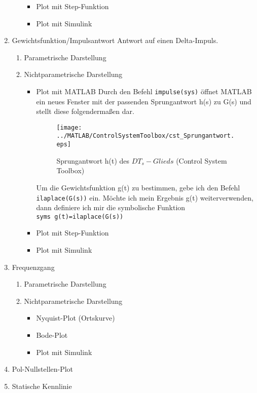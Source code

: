 \begin{enumerate}
\begin{enumerate}
\begin{itemize}
                    \item{Plot mit Step-Funktion}
                    \item{Plot mit Simulink}
                \end{itemize}
        \end{enumerate}

    \item{Gewichtsfunktion/Impulsantwort}
        Antwort auf einen Delta-Impuls.
        \begin{enumerate}
            \item{Parametrische Darstellung}
            \item{Nichtparametrische Darstellung}
                \begin{itemize}
                    \item{Plot mit MATLAB}
                    Durch den Befehl \texttt{impulse(sys)} öffnet MATLAB ein neues Fenster mit der passenden Sprungantwort h(s) zu G(s) und stellt diese folgendermaßen dar.
                    \begin{figure}[H]
                        \centering
                        \texttt{[image: ../MATLAB/ControlSystemToolbox/cst\_Sprungantwort.eps]}
                        \caption{Sprungantwort h(t) des $DT_s-Glieds$ (Control System Toolbox)}
                    \end{figure}

                    
                    Um die Gewichtsfunktion g(t) zu bestimmen, gebe ich den Befehl\\
                        \texttt{ilaplace(G(s))}
                    ein.
                    Möchte ich mein Ergebnis g(t) weiterverwenden, dann definiere ich mir die symbolische Funktion\\
                        \texttt{syms g(t)=ilaplace(G(s))}

                    \item{Plot mit Step-Funktion}
                    \item{Plot mit Simulink}
                \end{itemize}
        \end{enumerate}

    \item{Frequenzgang}
        \begin{enumerate}
            \item{Parametrische Darstellung}
            \item{Nichtparametrische Darstellung}
                \begin{itemize}
                    \item{Nyquist-Plot (Ortskurve)}
                    \item{Bode-Plot}
                    \item{Plot mit Simulink}
                \end{itemize}
        \end{enumerate}

    \item{Pol-Nullstellen-Plot}

    \item{Statische Kennlinie}

\end{enumerate}